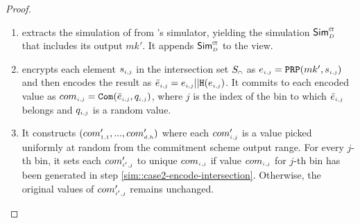 \begin{proof}
\begin{enumerate}
%
 \item extracts the simulation of \ct from \ct's simulator, yielding  the simulation $\mathsf{Sim}^{\scriptscriptstyle \mathtt{CT}}_{\scriptscriptstyle D}$ that includes its output $mk'$. It appends $\mathsf{Sim}^{\scriptscriptstyle \mathtt{CT}}_{\scriptscriptstyle D}$ to the view. 
 
%
 
 \item\label{sim::case2-encode-intersection} encrypts each element $s_{\scriptscriptstyle i,j}$ in the intersection set $S_{\scriptscriptstyle \cap}$  as $e_{\scriptscriptstyle i,j}=\mathtt{PRP}(mk', s_{\scriptscriptstyle i,j})$ and then encodes the result as $\bar{e}_{\scriptscriptstyle i,j} = e_{\scriptscriptstyle i,j}||\mathtt{H}(e_{\scriptscriptstyle i, j})$. It commits to each encoded value as $com_{\scriptscriptstyle i,j}=\mathtt{Com}(\bar{e}_{\scriptscriptstyle i,j}, q_{\scriptscriptstyle i,j})$, where $j$ is the index of the bin to which $\bar{e}_{\scriptscriptstyle i,j}$ belongs and  $q_{\scriptscriptstyle i, j}$ is a random value. 
 
 
 
  \item\label{sim::case2-gen-commitments} It constructs $(com'_{\scriptscriptstyle 1,1}, ..., com'_{\scriptscriptstyle d, h})$ where each $com'_{\scriptscriptstyle i, j}$ is a value picked uniformly at random from the commitment scheme output range. For every $j$-th bin, it sets each  $com'_{\scriptscriptstyle i', j}$ to unique $com_{\scriptscriptstyle i,j}$ if value $com_{\scriptscriptstyle i,j}$ for $j$-th bin has been generated in step \ref{sim::case2-encode-intersection}. Otherwise, the original values of $com'_{\scriptscriptstyle i', j}$ remains unchanged. 
 
 
 
 
 
% 
%
 

\end{enumerate}
\end{proof}
